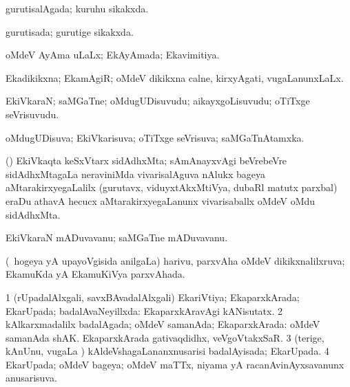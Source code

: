 {\bentry
{} 
\gl{\gu}
\expl{}
\bmng
gurutisalAgada; kuruhu sikakxda. 
\emng
\eentry

\bentry
{} 
\gl{\gu}
\expl{}
\bmng
gurutisada; gurutige sikakxda. 
\emng
\eentry

\bentry
{}
\gl{\nA}
\expl{}
\bmng
{} 
\emng
\eentry

\bentry
{} 
\gl{\gu}
\expl{}
\bmng
oMdeV AyAma uLaLx; EkAyAmada; Ekavimitiya. 
\emng
\eentry

\bentry
{} 
\gl{\gu}
\expl{}
\bmng
Ekadikikxna; EkamAgiR; oMdeV dikikxna calne, kirxyAgati, \mo vugaLanunxLaLx. 
\emng
\eentry

\bentry
{} 
\gl{\saMkiSx}
\expl{}
\bmng
{} 
\emng
\eentry

\bentry
{} 
\gl{\nA}
\expl{}
\bmng
EkiVkaraN; saMGaTne; oMdugUDisuvudu; aikayxgoLisuvudu; oTiTxge seVrisuvudu. 
\emng
\eentry

\bentry
{} 
\gl{\gu}
\expl{}
\bmng
oMdugUDisuva; EkiVkarisuva; oTiTxge seVrisuva; saMGaTnAtamxka. 
\emng
\eentry

\bentry
{}
\gl{\nA}
\expl{}
\bmng
(\Bwvi) EkiVkaqta keSxVtarx sidAdhxMta; sAmAnayxvAgi beVrebeVre sidAdhxMtagaLa neraviniMda vivarisalAguva nAlukx bageya aMtarakirxyegaLalilx (gurutavx, viduyxtAkxMtiVya, dubaRl matutx parxbal) eraDu athavA hecucx aMtarakirxyegaLanunx vivarisaballx oMdeV oMdu sidAdhxMta. 
\emng
\eentry

\bentry
{} 
\gl{\nA}
\expl{}
\bmng
EkiVkaraN mADuvavanu; saMGaTne mADuvavanu. 
\emng
\eentry

\bentry
{} 
\gl{\gu}
\expl{}
\bmng
(\kanmu\ hogeya yA upayoVgisida anilgaLa) harivu, parxvAha oMdeV dikikxnalilxruva; EkamuKda yA EkamuKiVya parxvAhada. 
\emng
\eentry

\bentry
{} 
\gl{\gu}
\expl{}
\bmng
\bnum
\num{1} (rUpadalAlxgali, savxBAvadalAlxgali) EkariVtiya; EkaparxkArada; EkarUpada; badalAvaNeyillxda:  EkaparxkAravAgi kANisutatx. 
\num{2} kAlkarxmadalilx badalAgada; oMdeV samanAda; EkaparxkArada:  oMdeV samanAda shAK.  EkaparxkArada gativaqdidhx, veVgoVtakxSaR. 
\num{3} (terige, kAnUnu, \mo vugaLa \vi) kAldeVshagaLananxnusarisi badalAyisada; EkarUpada. 
\num{4} EkarUpada; oMdeV bageya; oMdeV maTTx, niyama yA racanAvinAyxsavanunx anusarisuva. 
\enum
\emng
\eentry

}
